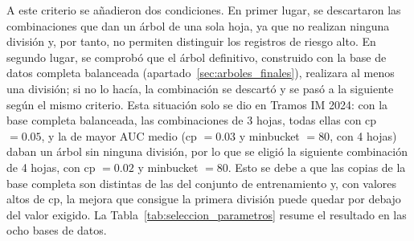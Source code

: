 \documentclass[twoside,a4paper,12pt,onecolumn,openany]{book}
\begin{document}
A este criterio se añadieron dos condiciones. En primer lugar, se descartaron las combinaciones que dan un árbol de una sola hoja, ya que no realizan ninguna división y, por tanto, no permiten distinguir los registros de riesgo alto. En segundo lugar, se comprobó que el árbol definitivo, construido con la base de datos completa balanceada (apartado~\ref{sec:arboles_finales}), realizara al menos una división; si no lo hacía, la combinación se descartó y se pasó a la siguiente según el mismo criterio. Esta situación solo se dio en Tramos IM 2024: con la base completa balanceada, las combinaciones de 3 hojas, todas ellas con cp $=0.05$, y la de mayor AUC medio (cp $=0.03$ y minbucket $=80$, con 4 hojas) daban un árbol sin ninguna división, por lo que se eligió la siguiente combinación de 4 hojas, con cp $=0.02$ y minbucket $=80$. Esto se debe a que las copias de la base completa son distintas de las del conjunto de entrenamiento y, con valores altos de cp, la mejora que consigue la primera división puede quedar por debajo del valor exigido. La Tabla~\ref{tab:seleccion_parametros} resume el resultado en las ocho bases de datos.
 
\begin{table}[H]
\centering
\small
{}
\caption{Mejor AUC medio de la búsqueda y combinación de parámetros elegida con la regla de una desviación típica en cada base de datos. El número de hojas corresponde al árbol construido con todo el conjunto de entrenamiento balanceado.}
\label{tab:seleccion_parametros}
\end{table}
 
\end{document}
